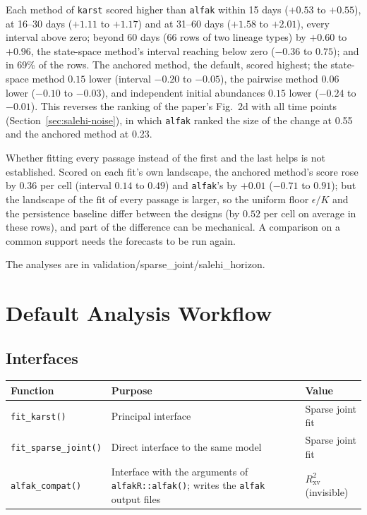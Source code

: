 \documentclass[11pt]{article}
\begin{document}
Each method of \texttt{karst} scored higher than \texttt{alfak} within 15
days ($+0.53$ to $+0.55$), at 16--30 days ($+1.11$ to $+1.17$) and at 31--60
days ($+1.58$ to $+2.01$), every interval above zero; beyond 60 days (66 rows
of two lineage types) by $+0.60$ to $+0.96$, the state-space method's interval
reaching below zero ($-0.36$ to $0.75$); and in 69\% of the rows. The anchored method, the default, scored highest; the state-space
method $0.15$ lower (interval $-0.20$ to $-0.05$), the pairwise method $0.06$
lower ($-0.10$ to $-0.03$), and independent initial abundances $0.15$ lower
($-0.24$ to $-0.01$). This reverses the ranking of the paper's Fig.~2d with
all time points (Section~\ref{sec:salehi-noise}), in which \texttt{alfak}
ranked the size of the change at 0.55 and the anchored method at 0.23.

Whether fitting every passage instead of the first and the last helps is not
established. Scored on each fit's own landscape, the anchored method's score
rose by $0.36$ per cell (interval $0.14$ to $0.49$) and \texttt{alfak}'s by
$+0.01$ ($-0.71$ to $0.91$); but the landscape of the fit of every passage is
larger, so the uniform floor $\epsilon/K$ and the persistence baseline differ
between the designs (by $0.52$ per cell on average in these rows), and part
of the difference can be mechanical. A comparison on a common support needs
the forecasts to be run again.


The analyses are in validation/sparse\_joint/salehi\_horizon.

\section{Default Analysis Workflow}
\label{sec:workflow}

\subsection{Interfaces}

\begin{center}
\begin{tabular}{L{0.22\textwidth}L{0.44\textwidth}L{0.24\textwidth}}
\toprule
Function & Purpose & Value \\
\midrule
\texttt{fit\_karst()} & Principal interface & Sparse joint fit \\
\texttt{fit\_sparse\_joint()} & Direct interface to the same model & Sparse
joint fit \\
\texttt{alfak\_compat()} & Interface with the arguments of
\texttt{alfakR::alfak()}; writes the \texttt{alfak} output files &
$R^2_{\mathrm{xv}}$ (invisible) \\
\bottomrule
\end{tabular}
\end{center}
\end{document}
